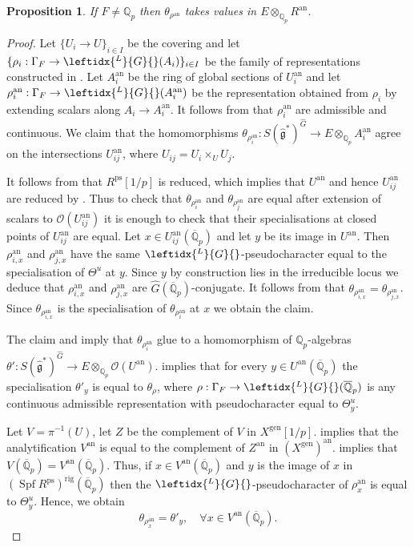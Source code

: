 \documentclass{amsart}
\newtheorem{prop}{Proposition}[section]
\theoremstyle{definition}
\theoremstyle{remark}
\newcommand{\Qp}{\mathbb {Q}_p}
\newcommand{\Qpbar}{\overline{\mathbb{Q}}_p}
\newcommand{\OO}{\mathcal O}
\newcommand{\ana}{\mathrm{an}}
\newcommand{\gen}{\mathrm{gen}}
\DeclareMathOperator{\Spf}{Spf}
\newcommand{\rig}{\mathrm{rig}}
\newcommand{\ps}{\mathrm{ps}}
\newcommand{\Ghat}{\widehat{G}}
\newcommand{\LG}{\leftidx{^L}{G}{}}
\newcommand{\ghat}{\widehat{\mathfrak g}}
\begin{document}
\begin{prop}\label{work} If $F\neq \Qp$ then 
$\theta_{\rho^{\ana}}$ takes values in $E\otimes_{\Qp} R^{\ana}$.
\end{prop}
\begin{proof} Let 
$\{U_i\rightarrow
U\}_{i\in I}$ 
be the covering and let 
$\{\rho_i: \Gamma_F \rightarrow \LG(A_i)\}_{i\in I}$ be the family of representations constructed in . Let $A_i^{\ana}$ be the 
ring of global sections of $U_i^{\ana}$ and let $\rho_i^{\ana}:\Gamma_F \rightarrow \LG(A_i^{\ana})$ be the 
representation obtained from $\rho_i$ by extending scalars along $A_i \rightarrow A_i^{\ana}$. 
It follows from  that $\rho_i^{\ana}$ are admissible and continuous. 
We claim that the homomorphisms 
$\theta_{\rho_i^{\ana}}: S(\ghat^*)^{\Ghat}\rightarrow 
E\otimes_{\Qp} A_i^{\ana}$ agree on the intersections 
$U_{ij}^{\ana}$, where $U_{ij} =U_i\times_{U} U_j$.

It follows from  that $
R^{\ps}[1/p]$ is reduced, which implies that $U^{\ana}$ and hence $U_{ij}^{\ana}$ are reduced by .
Thus to check that $\theta_{\rho^{\ana}_i}$ and 
$\theta_{\rho^{\ana}_j}$ 
are equal after extension of scalars to $\OO(U_{ij}^{\ana})$ it is enough to check that their specialisations 
at closed points of $U_{ij}^{\ana}$ 
are equal. Let $x\in U_{ij}^{\ana}(\Qpbar)$ 
and let $y$ be its image in $U^{\ana}$. Then
$\rho_{i,x}^{\ana}$ and $\rho_{j, x}^{\ana}$ have the same 
$\LG$-pseudocharacter equal to 
the specialisation of $\Theta^u$ at $y$. Since 
$y$ by construction lies in the irreducible locus  we deduce that $\rho_{i,x}^{\ana}$ and $\rho_{j,x}^{\ana}$ are
$\Ghat(\Qpbar)$-conjugate. It follows 
from  that $\theta_{\rho_{i, x}^{\ana}}=
\theta_{\rho_{j,x}^{\ana}}$. Since $\theta_{\rho_{i, x}^{\ana}}$
is the specialisation of $\theta_{\rho_i^{\ana}}$ at $x$ 
we obtain the claim. 

The claim  and    imply that $\theta_{\rho_i^{\ana}}$ glue 
to a homomorphism of $\Qp$-algebras 
$\theta':S(\ghat^*)^{\Ghat}\rightarrow E\otimes_{\Qp} \OO(U^{\ana})$.  implies that 
for every $y\in U^{\ana}(\Qpbar)$ the specialisation 
$\theta'_y$ is equal to $\theta_{\rho}$, where
$\rho: \Gamma_F \rightarrow \LG(\Qpbar)$ is any 
continuous admissible representation
with  pseudocharacter equal to $\Theta^u_y$. 

Let $V=\pi^{-1}(U)$, let $Z$ be the complement of $V$ in $X^{\gen}[1/p]$.  implies that the analytification $V^{\ana}$ is equal to  the complement of $Z^{\ana}$ in $(X^{\gen})^{\ana}$. 
 implies that $V(\Qpbar)=V^{\ana}(\Qpbar)$. Thus,
if $x\in V^{\ana}(\Qpbar)$ and $y$ is the image of $x$ in $(\Spf R^{\ps})^{\rig}(\Qpbar)$ then the 
$\LG$-pseudocharacter of $\rho^{\ana}_x$ is equal to $\Theta^u_y$. Hence, we obtain 
\begin{equation}\label{special}
\theta_{\rho^{\ana}_x} = \theta'_y, \quad \forall x\in V^{\ana}(\Qpbar).
\end{equation}



\end{proof}
\end{document}
